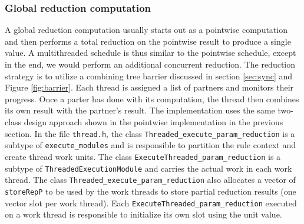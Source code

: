 \documentclass{article}
\begin{document}
\subsubsection{Global reduction computation}
\label{sec:gr}
A global reduction computation usually starts out as a pointwise
computation and then performs a total reduction on the pointwise result
to produce a single value.  A multithreaded schedule is thus similar to
the pointwise schedule, except in the end, we would perform an
additional concurrent reduction.  The reduction strategy is to utilize a
combining tree barrier discussed in section \ref{sec:sync} and Figure
\ref{fig:barrier}.  Each thread is assigned a list of partners and
monitors their progress.  Once a parter has done with its computation,
the thread then combines its own result with the partner's result.
The implementation uses the same two-class design approach shown in the
pointwise implementation in the previous section.  In the file
\texttt{thread.h}, the class
\lstinline{Threaded_execute_param_reduction} is a subtype of
\lstinline{execute_modules} and is responsible to partition the rule
context and create thread work units.  The class
\lstinline{ExecuteThreaded_param_reduction} is a subtype of
\lstinline{ThreadedExecutionModule} and carries the actual work in each
work thread.  The class \lstinline{Threaded_execute_param_reduction}
also allocates a vector of \lstinline{storeRepP} to be used by the work
threads to store partial reduction results (one vector slot per work
thread).  Each \lstinline{ExecuteThreaded_param_reduction} executed on a
work thread is responsible to initialize its own slot using the unit
value.  
\end{document}
